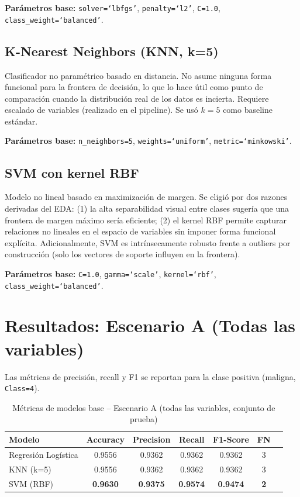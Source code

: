 \documentclass[11pt,a4paper]{article}
\begin{document}
\textbf{Parámetros base:} \texttt{solver=`lbfgs'}, \texttt{penalty=`l2'}, \texttt{C=1.0}, \texttt{class\_weight=`balanced'}.

\subsection{K-Nearest Neighbors (KNN, k=5)}

Clasificador no paramétrico basado en distancia. No asume ninguna forma funcional para la frontera de decisión, lo que lo hace útil como punto de comparación cuando la distribución real de los datos es incierta. Requiere escalado de variables (realizado en el pipeline). Se usó $k=5$ como baseline estándar.

\textbf{Parámetros base:} \texttt{n\_neighbors=5}, \texttt{weights=`uniform'}, \texttt{metric=`minkowski'}.

\subsection{SVM con kernel RBF}

Modelo no lineal basado en maximización de margen. Se eligió por dos razones derivadas del EDA: (1) la alta separabilidad visual entre clases sugería que una frontera de margen máximo sería eficiente; (2) el kernel RBF permite capturar relaciones no lineales en el espacio de variables sin imponer forma funcional explícita. Adicionalmente, SVM es intrínsecamente robusto frente a outliers por construcción (solo los vectores de soporte influyen en la frontera).

\textbf{Parámetros base:} \texttt{C=1.0}, \texttt{gamma=`scale'}, \texttt{kernel=`rbf'}, \texttt{class\_weight=`balanced'}.

\section{Resultados: Escenario A (Todas las variables)}

Las métricas de precisión, recall y F1 se reportan para la clase positiva (maligna, \texttt{Class=4}).

\begin{table}[H]
\centering
\caption{Métricas de modelos base -- Escenario A (todas las variables, conjunto de prueba)}
\renewcommand{\arraystretch}{1.15}
\begin{tabular}{lcccccc}
\toprule
\textbf{Modelo} & \textbf{Accuracy} & \textbf{Precision} & \textbf{Recall} & \textbf{F1-Score} & \textbf{FN} \\
\midrule
Regresión Logística & 0.9556 & 0.9362 & 0.9362 & 0.9362 & 3 \\
KNN (k=5) & 0.9556 & 0.9362 & 0.9362 & 0.9362 & 3 \\
\rowcolor{bestrow}
SVM (RBF) & \textbf{0.9630} & \textbf{0.9375} & \textbf{0.9574} & \textbf{0.9474} & \textbf{2} \\
\bottomrule
\end{tabular}
\end{table}
\end{document}
